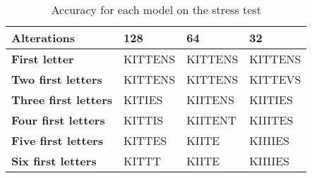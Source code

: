 \begin{table}[ht]
    \centering
    \begin{tabular}{|l|l|l|l|}
        \hline 
        \textbf{Alterations}              & \textbf{128}                     & \textbf{64}                      & \textbf{32}                      \\ \hline
        \textbf{First letter}             & KITTENS                          & KITTENS                          & KITTENS                          \\ \hline
        \textbf{Two first letters}        & KITTENS                          & KITTENS                          & KITTEVS                          \\ \hline
        \textbf{Three first letters}      & KITIES                           & KIITENS                          & KIITIES                          \\ \hline
        \textbf{Four first letters}       & KITTIS                           & KIITENT                          & KIIITES                          \\ \hline
        \textbf{Five first letters}       & KITTES                           & KIITE                            & KIIIIES                          \\ \hline
        \textbf{Six first letters}        & KITTT                            & KIITE                            & KIIIIES                          \\ \hline
    \end{tabular}
    \caption{Accuracy for each model on the stress test}
    \label{table:accuracy_stress_test}
\end{table}